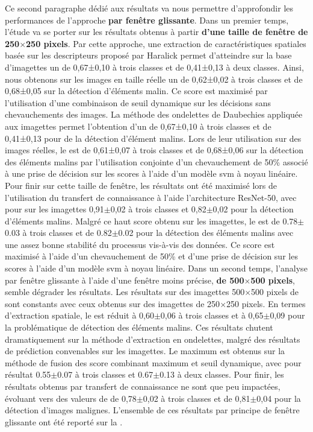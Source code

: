 Ce second paragraphe dédié aux résultats va nous permettre d'approfondir les performances de l'approche \textbf{par fenêtre glissante}. Dans un premier temps, l'étude va se porter sur les résultats obtenus à partir\textbf{ d'une taille de fenêtre de 250$\times$250 pixels}. Par cette approche, une extraction de caractéristiques spatiales basée sur les descripteurs proposé par Haralick permet d'atteindre sur la base d'imagettes un \fscore{} de 0,67±0,10 à trois classes et de 0,41±0,13 à deux classes. Ainsi, nous obtenons sur les images en taille réelle un \fscore{} de 0,62±0,02 à trois classes et de 0,68±0,05 sur la détection d'éléments malin. Ce score est maximisé par l'utilisation d'une combinaison de seuil dynamique sur les décisions sans chevauchements des images. La méthode des ondelettes de Daubechies appliquée aux imagettes permet l'obtention d'un \fscore{} de 0,67±0,10 à trois classes et de 0,41±0,13 pour de la détection d'élément malins. Lors de leur utilisation sur des images réelles, le \fscore{} est de 0,61±0,07 à trois classes et de 0,68±0,06 sur la détection des éléments malins par l'utilisation conjointe d'un chevauchement de 50\% associé à une prise de décision sur les scores à l'aide d'un modèle \gls{svm} à noyau linéaire. Pour finir sur cette taille de fenêtre, les résultats ont été maximisé lors de l'utilisation du transfert de connaissance à l'aide l'architecture ResNet-50, avec pour \fscore{} sur les imagettes 0,91$\pm$0,02 à trois classes et 0,82$\pm$0,02 pour la détection d'éléments malins. Malgré ce haut score obtenu sur les imagettes, le \fscore{} est de 0.78$\pm$0.03 à trois classes et de 0.82$\pm$0.02 pour la détection des éléments malins avec une assez bonne stabilité du processus vis-à-vis des données. Ce score est maximisé à l'aide d'un chevauchement de 50\% et d'une prise de décision sur les scores à l'aide d'un modèle \gls{svm} à noyau linéaire. Dans un second temps, l'analyse par fenêtre glissante à l'aide d'une fenêtre moins précise, \textbf{de 500$\times$500 pixels}, semble dégrader les résultats. Les résultats sur des imagettes 500$\times$500 pixels de sont constants avec ceux obtenus sur des imagettes de 250$\times$250 pixels. En termes d'extraction spatiale, le \fscore{} est réduit à 0,60$\pm$0,06 à trois classes et à 0,65$\pm$0,09 pour la problématique de détection des éléments malins. Ces résultats chutent dramatiquement sur la méthode d'extraction en ondelettes, malgré des résultats de prédiction convenables sur les imagettes. Le \fscore{} maximum est obtenus sur la méthode de fusion des score combinant maximum et seuil dynamique, avec pour résultat 0.55$\pm$0.07 à trois classes et 0.67$\pm$0.13 à deux classes. Pour finir, les résultats obtenus par transfert de connaissance ne sont que peu impactées, évoluant vers des valeurs de \fscore{} de 0,78$\pm$0,02 à trois classes et de 0,81$\pm$0,04 pour la détection d'images malignes. L'ensemble de ces résultats par principe de fenêtre glissante ont été reporté sur la .\par

